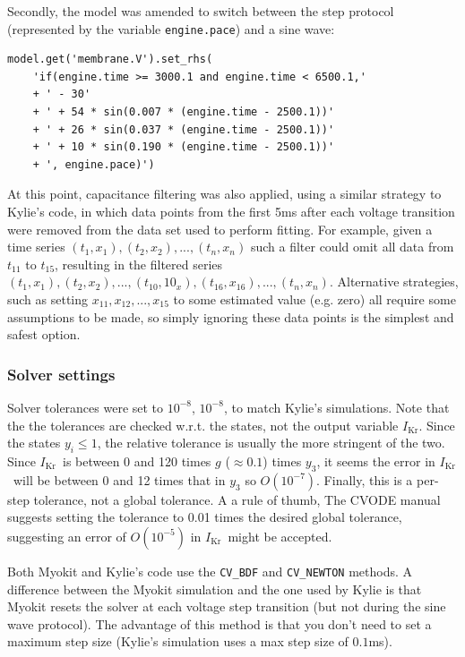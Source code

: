 \documentclass[preprint,authoryear,10pt]{elsarticle}
\newcommand{\code}[1]{\texttt{#1}}
\newcommand{\ikr}{{$I_\text{Kr}$}}
\begin{document}
Secondly, the model was amended to switch between the step protocol
 (represented by the variable \code{engine.pace}) and a sine wave:

\begin{verbatim}
model.get('membrane.V').set_rhs(
    'if(engine.time >= 3000.1 and engine.time < 6500.1,'
    + ' - 30'
    + ' + 54 * sin(0.007 * (engine.time - 2500.1))'
    + ' + 26 * sin(0.037 * (engine.time - 2500.1))'
    + ' + 10 * sin(0.190 * (engine.time - 2500.1))'
    + ', engine.pace)')
\end{verbatim}

At this point, capacitance filtering was also applied, using a similar strategy
 to Kylie's code, in which data points from the first 5ms after each voltage
 transition were removed from the data set used to perform fitting.
For example, given a time series $(t_1, x_1), (t_2, x_2), ..., (t_n, x_n)$
 such a filter could omit all data from $t_{11}$ to $t_{15}$, resulting in the
 filtered series
 $(t_1, x_1), (t_2, x_2), ..., (t_{10}, 10_{x}), (t_{16}, x_{16}), ..., (t_n, x_n)$.
Alternative strategies, such as setting $x_{11}, x_{12}, ..., x_{15}$ to some
 estimated value (e.g. zero) all require some assumptions to be made, so simply
 ignoring these data points is the simplest and safest option.

\subsubsection{Solver settings}

Solver tolerances were set to $10^{-8}$, $10^{-8}$, to match Kylie's
 simulations.
Note that the the tolerances are checked w.r.t. the states, not the output
 variable \ikr.
Since the states $y_i \leq 1$, the relative tolerance is usually the more
 stringent of the two.
Since \ikr\ is between 0 and 120 times $g$ ($\approx 0.1$) times $y_3$, it
 seems the error in \ikr\ will be between 0 and 12 times that in $y_3$ so
 $O(10^{-7})$.
Finally, this is a per-step tolerance, not a global tolerance.
A a rule of thumb, The CVODE manual suggests setting the tolerance to 0.01
 times the desired global tolerance, suggesting an error of $O(10^{-5})$ in
 \ikr\ might be accepted.

Both Myokit and Kylie's code use the \code{CV\_BDF} and \code{CV\_NEWTON}
 methods.
A difference between the Myokit simulation and the one used by Kylie is that
 Myokit resets the solver at each voltage step transition (but not during the
 sine wave protocol).
The advantage of this method is that you don't need to set a maximum step size
 (Kylie's simulation uses a max step size of $0.1$ms).
\end{document}

